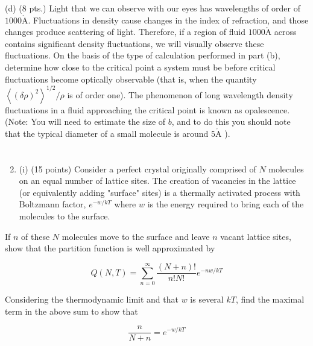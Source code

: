 \documentclass[10pt]{article}
\def\AA{\mathring{\mathrm{A}}}
\begin{document}
(d) (8 pts.) Light that we can observe with our eyes has wavelengths of order of $1000 \AA$. Fluctuations in density cause changes in the index of refraction, and those changes produce scattering of light. Therefore, if a region of fluid $1000 \AA$ across contains significant density fluctuations, we will visually observe these fluctuations. On the basis of the type of calculation performed in part (b), determine how close to the critical point a system must be before critical fluctuations become optically observable (that is, when the quantity $\left\langle(\delta \rho)^{2}\right\rangle^{1 / 2} / \rho$ is of order one). The phenomenon of long wavelength density fluctuations in a fluid approaching the critical point is known as opalescence. (Note: You will need to estimate the size of $b$, and to do this you should note that the typical diameter of a small molecule is around $5 \AA$ ).
\section{}
\begin{enumerate}
  \setcounter{enumi}{1}
  \item (i) (15 points) Consider a perfect crystal originally comprised of $N$ molecules on an equal number of lattice sites. The creation of vacancies in the lattice (or equivalently adding "surface" sites) is a thermally activated process with Boltzmann factor, $e^{-w / k T}$ where $w$ is the energy required to bring each of the molecules to the surface.
\end{enumerate}

If $n$ of these $N$ molecules move to the surface and leave $n$ vacant lattice sites, show that the partition function is well approximated by

$$
Q(N, T)=\sum_{n=0}^{\infty} \frac{(N+n) !}{n ! N !} e^{-n w / k T}
$$

Considering the thermodynamic limit and that $w$ is several $k T$, find the maximal term in the above sum to show that

$$
\frac{n}{N+n}=e^{-w / k T}
$$
\end{document}
